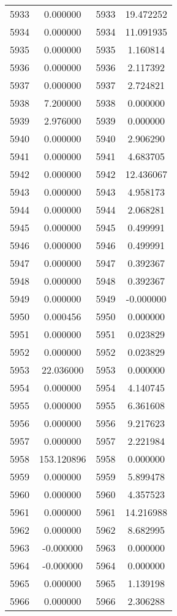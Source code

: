 \documentclass[12pt]{article}
\begin{document}
\begin{longtable}{@{}cccc@{}}
5933 & 0.000000 & 5933 & 19.472252 \\
5934 & 0.000000 & 5934 & 11.091935 \\
5935 & 0.000000 & 5935 & 1.160814 \\
5936 & 0.000000 & 5936 & 2.117392 \\
5937 & 0.000000 & 5937 & 2.724821 \\
5938 & 7.200000 & 5938 & 0.000000 \\
5939 & 2.976000 & 5939 & 0.000000 \\
5940 & 0.000000 & 5940 & 2.906290 \\
5941 & 0.000000 & 5941 & 4.683705 \\
5942 & 0.000000 & 5942 & 12.436067 \\
5943 & 0.000000 & 5943 & 4.958173 \\
5944 & 0.000000 & 5944 & 2.068281 \\
5945 & 0.000000 & 5945 & 0.499991 \\
5946 & 0.000000 & 5946 & 0.499991 \\
5947 & 0.000000 & 5947 & 0.392367 \\
5948 & 0.000000 & 5948 & 0.392367 \\
5949 & 0.000000 & 5949 & -0.000000 \\
5950 & 0.000456 & 5950 & 0.000000 \\
5951 & 0.000000 & 5951 & 0.023829 \\
5952 & 0.000000 & 5952 & 0.023829 \\
5953 & 22.036000 & 5953 & 0.000000 \\
5954 & 0.000000 & 5954 & 4.140745 \\
5955 & 0.000000 & 5955 & 6.361608 \\
5956 & 0.000000 & 5956 & 9.217623 \\
5957 & 0.000000 & 5957 & 2.221984 \\
5958 & 153.120896 & 5958 & 0.000000 \\
5959 & 0.000000 & 5959 & 5.899478 \\
5960 & 0.000000 & 5960 & 4.357523 \\
5961 & 0.000000 & 5961 & 14.216988 \\
5962 & 0.000000 & 5962 & 8.682995 \\
5963 & -0.000000 & 5963 & 0.000000 \\
5964 & -0.000000 & 5964 & 0.000000 \\
5965 & 0.000000 & 5965 & 1.139198 \\
5966 & 0.000000 & 5966 & 2.306288 \\

\end{longtable}
\end{document}
